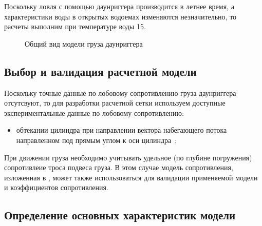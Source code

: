 \documentclass[russian,utf8, pointsubsection]{eskdtext}
\begin{document}
Поскольку ловля с помощью даунриггера производится в летнее время, а характеристики воды в открытых водоемах изменяются незначительно, то расчеты выполним при температуре воды 15\cels. 

\begin{figure}[h]
\caption{Общий вид модели груза даунриггера}
\label{ris:allView}
\end{figure}



\subsection{Выбор и валидация расчетной модели}

Поскольку точные данные по лобовому сопротивлению груза даунриггера отсутсвуют, то для разработки расчетной сетки используем доступные экспериментальные данные по лобовому сопротивлению:
\begin{itemize}
\item обтекании цилиндра при направлении вектора набегающего потока направленном под прямым углом к оси цилиндра~\cite{cylInFlow};
\end{itemize}

При движении груза необходимо учитывать удельное (по глубине погружения) сопротивлеие троса подвеса груза. В этом случае модель сопротивления, изложенная в \cite{cylInFlow}, может также использоваться для валидации применяемой модели и коэффициентов сопротивления. 


\subsection{Определение основных характеристик модели}
\end{document}
